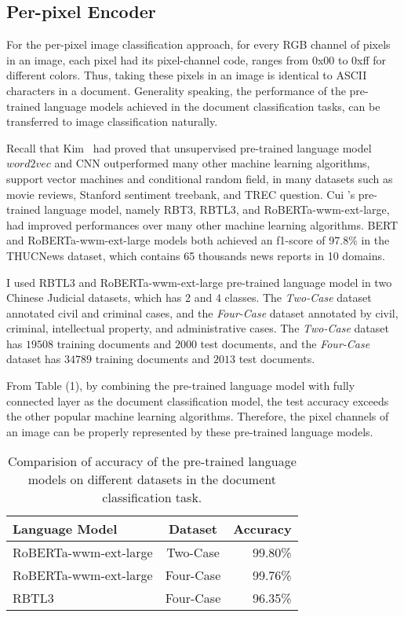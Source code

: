 \documentclass[review]{cvpr}
\begin{document}
\subsection{Per-pixel Encoder}

For the per-pixel image classification approach, for every RGB channel of pixels in an image,
each pixel had its pixel-channel code, ranges from 0x00 to 0xff for different colors.
Thus, taking these pixels in an image is identical to ASCII characters in a document.
Generality speaking, the performance of the pre-trained language models achieved in the document classification tasks, can be transferred to image classification naturally.

\par Recall that Kim~\cite{kim2014convolutional} had proved that unsupervised pre-trained language model $word2vec$ and CNN outperformed many other machine learning algorithms,
\eg support vector machines and conditional random field, in many datasets such as movie reviews, Stanford sentiment treebank, and TREC question.
Cui \etal's pre-trained language model, namely RBT3, RBTL3, and RoBERTa-wwm-ext-large, had improved performances over many other machine learning algorithms.
BERT and RoBERTa-wwm-ext-large models both achieved an f1-score of 97.8\% in the THUCNews dataset, which contains 65 thousands news reports in 10 domains.

\par I used RBTL3 and RoBERTa-wwm-ext-large pre-trained language model in two Chinese Judicial datasets, which has 2 and 4 classes.
The \textit{Two-Case} dataset annotated civil and criminal cases, and the \textit{Four-Case} dataset annotated by civil, criminal, intellectual property, and administrative cases.
The \textit{Two-Case} dataset has $19508$ training documents and $2000$ test documents, and the \textit{Four-Case} dataset has $34789$ training documents and $2013$ test documents.

\par From Table (1), by combining the pre-trained language model with fully connected layer as the document classification model,
the test accuracy exceeds the other popular machine learning algorithms.
Therefore, the pixel channels of an image can be properly represented by these pre-trained language models.

\begin{table}
\begin{center}
\begin{tabular}{|l|c|r|}
\hline
Language Model 	& Dataset & Accuracy \\
\hline\hline
RoBERTa-wwm-ext-large & Two-Case	&	99.80\% \\
RoBERTa-wwm-ext-large & Four-Case	&	99.76\% \\
RBTL3  & Four-Case	&	96.35\% \\
\hline
\end{tabular}
\end{center}
\caption{Comparision of accuracy of the pre-trained language models on different datasets in the document classification task.}
\end{table}
\end{document}
